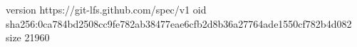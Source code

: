 version https://git-lfs.github.com/spec/v1
oid sha256:0ca784bd2508cc9fe782ab38477eae6cfb2d8b36a27764ade1550cf782b4d082
size 21960
